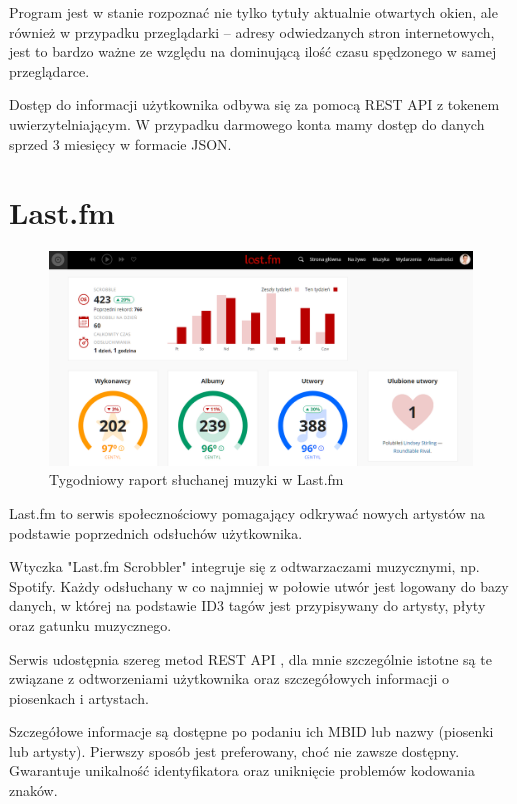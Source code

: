 \documentclass[openright]{xmgr}
\begin{document}
            Program jest w stanie rozpoznać nie tylko tytuły aktualnie otwartych okien,
            ale również w przypadku przeglądarki – adresy odwiedzanych stron internetowych,
            jest to bardzo ważne ze względu na dominującą ilość czasu spędzonego w samej przeglądarce.

            Dostęp do informacji użytkownika odbywa się za pomocą REST API z tokenem uwierzytelniającym.
            W przypadku darmowego konta mamy dostęp do danych sprzed 3 miesięcy w formacie JSON.

        \section*{Last.fm}

            \begin{figure}
                \includegraphics[width=\linewidth]{fig/lastfm-weekly.png}
                \caption{Tygodniowy raport słuchanej muzyki w Last.fm}
                \label{fig:lastfm-weekly}
            \end{figure}

            Last.fm to serwis społecznościowy pomagający odkrywać nowych artystów na podstawie poprzednich odsłuchów użytkownika.

            Wtyczka "Last.fm Scrobbler" \cite{lastfm:trackmymusic} integruje się z odtwarzaczami muzycznymi, np. Spotify.
            Każdy odsłuchany w co najmniej w połowie utwór jest logowany do bazy danych,
            w której na podstawie ID3 tagów jest przypisywany do artysty, płyty oraz gatunku muzycznego.

            Serwis udostępnia szereg metod REST API \cite{lastfm:apidoc}, dla mnie szczególnie istotne są te
            związane z odtworzeniami użytkownika oraz szczegółowych informacji o piosenkach i artystach.

            Szczegółowe informacje są dostępne po podaniu ich MBID\cite{lastfm:mbid} lub nazwy (piosenki lub artysty).
            Pierwszy sposób jest preferowany, choć nie zawsze dostępny. Gwarantuje unikalność identyfikatora oraz uniknięcie problemów kodowania znaków.
\end{document}

